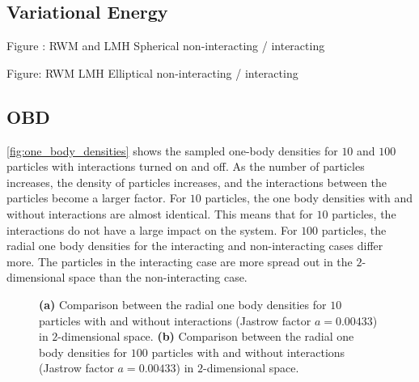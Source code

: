 \subsection{Variational Energy}

Figure : RWM and LMH Spherical non-interacting / interacting 

Figure: RWM LMH Elliptical non-interacting / interacting  

\subsection{OBD}

\autoref{fig:one_body_densities} shows the sampled one-body densities for $10$ and $100$ particles with interactions turned on and off. As the number of particles increases, the density of particles increases, and the interactions between the particles become a larger factor. For $10$ particles, the one body densities with and without interactions are almost identical. This means that for $10$ particles, the interactions do not have a large impact on the system. For $100$ particles, the radial one body densities for the interacting and non-interacting cases differ more. The particles in the interacting case are more spread out in the $2$-dimensional space than the non-interacting case. 
\begin{figure}[H]
\centering
{} 
\qquad
{}
\caption{\textbf{(a)} Comparison between the radial one body densities for $10$ particles with and without interactions (Jastrow factor $a=0.00433$) in $2$-dimensional space. \textbf{(b)} Comparison between the radial one body densities for $100$ particles with and without interactions (Jastrow factor $a=0.00433$) in $2$-dimensional space.}
\label{fig:one_body_densities}
\end{figure}



